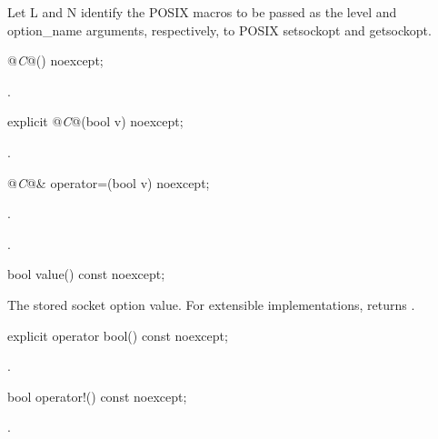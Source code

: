 \pnum
Let L and N identify the POSIX macros to be passed as the level and option_name arguments, respectively, to POSIX setsockopt and getsockopt.

\begin{itemdecl}
@\textit{C}@() noexcept;
\end{itemdecl}

\begin{itemdescr}
\pnum
\postconditions {}.
\end{itemdescr}

\begin{itemdecl}
explicit @\textit{C}@(bool v) noexcept;
\end{itemdecl}

\begin{itemdescr}
\pnum
\postconditions {}.
\end{itemdescr}

\begin{itemdecl}
@\textit{C}@& operator=(bool v) noexcept;
\end{itemdecl}

\begin{itemdescr}
\pnum
\returns {}.

\pnum
\postconditions {}.
\end{itemdescr}

\begin{itemdecl}
bool value() const noexcept;
\end{itemdecl}

\begin{itemdescr}
\pnum
\returns The stored socket option value. For extensible implementations, returns .
\end{itemdescr}

\begin{itemdecl}
explicit operator bool() const noexcept;
\end{itemdecl}

\begin{itemdescr}
\pnum
\returns {}.
\end{itemdescr}

\begin{itemdecl}
bool operator!() const noexcept;
\end{itemdecl}

\begin{itemdescr}
\pnum
\returns {}.
\end{itemdescr}

